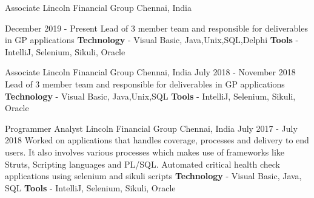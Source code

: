 

\begin{cventries}

  \cventry
    {Associate} %
    {Lincoln Financial Group} %
    {Chennai, India} %
    {December 2019 - Present %
    {
        Lead of 3 member team and responsible for deliverables in GP applications
        \newline
        \textbf{Technology} - Visual Basic, Java,Unix,SQL,Delphi \newline
        \textbf{Tools} - IntelliJ, Selenium, Sikuli, Oracle
    }

  \cventry
    {Associate} %
    {Lincoln Financial Group} %
    {Chennai, India} %
    {July 2018 - November 2018} %
    {
        Lead of 3 member team and responsible for deliverables in GP applications
        \newline
        \textbf{Technology} - Visual Basic, Java,Unix,SQL \newline
        \textbf{Tools} - IntelliJ, Selenium, Sikuli, Oracle
    }

  \cventry
    {Programmer Analyst} %
    {Lincoln Financial Group} %
    {Chennai, India} %
    {July 2017 - July 2018} %
    {
        Worked on applications that handles coverage, processes and delivery to end users. It also involves various processes which makes use of frameworks like Struts, Scripting languages and PL/SQL.
        \newline
        Automated critical health check applications using selenium and sikuli scripts\newline
        \textbf{Technology} - Visual Basic, Java, SQL \newline
        \textbf{Tools} - IntelliJ, Selenium, Sikuli, Oracle
    }

}
\end{cventries}
